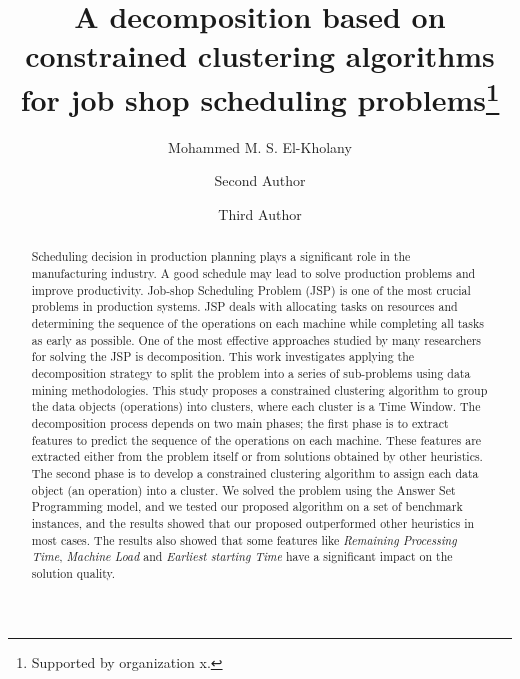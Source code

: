 \documentclass[runningheads]{llncs}
\begin{document}
%
\title{A decomposition based on constrained clustering algorithms for job shop scheduling problems\thanks{Supported by organization x.}}
%
%
\author{Mohammed M. S. El-Kholany \and
Second Author \and
Third Author}
%
%
%
\maketitle              %
%
\begin{abstract}
Scheduling decision in production planning plays a significant role in the manufacturing industry. A good schedule may lead to solve production problems and improve productivity. Job-shop Scheduling Problem (JSP) is one of the most crucial problems in production systems. JSP deals with allocating tasks on resources and determining the sequence of the operations on each machine while completing all tasks as early as possible. One of the most effective approaches studied by many researchers for solving the JSP is decomposition. This work investigates applying the decomposition strategy to split the problem into a series of sub-problems using data mining methodologies. This study proposes a constrained clustering algorithm to group the data objects (operations) into clusters, where each cluster is a Time Window. The decomposition process depends on two main phases; the first phase is to extract features to predict the sequence of the operations on each machine. These features are extracted either from the problem itself or from solutions obtained by other heuristics. The second phase is to develop a constrained clustering algorithm to assign each data object (an operation) into a cluster. We solved the problem using the Answer Set Programming model, and we tested our proposed algorithm on a set of benchmark instances, and the results showed that our proposed outperformed other heuristics in most cases. The results also showed that some features like \textit{Remaining Processing Time}, \textit{Machine Load} and \textit{Earliest starting Time} have a significant impact on the solution quality.

\end{abstract}
%
%
%
\end{document}
